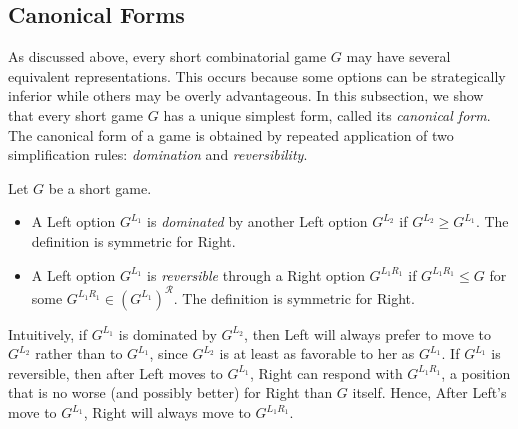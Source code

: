 \documentclass[oneside,reqno]{amsart}
\begin{document}
    \subsection{Canonical Forms}\label{subsec: canonical form}
    As discussed above, every short combinatorial game $G$ may have several equivalent representations. This occurs because some options can be strategically inferior 
    while others may be overly advantageous. In this subsection, we show that every short game $G$ has a unique simplest form, called its \emph{canonical form}. The canonical form of a game is obtained by repeated application of two simplification rules: \emph{domination} and \emph{reversibility}.
    

        

    \begin{definition}
        Let $G$ be a short game.
        \begin{itemize}
            \item A Left option $G^{L_1}$ is \emph{dominated} by another Left option $G^{L_2}$ if $G^{L_2} \ge G^{L_1}$. The definition is symmetric for Right.
            
            \item A Left option $G^{L_1}$ is \emph{reversible} through a Right option $G^{L_1R_1}$ if $G^{L_1R_1} \le G$ for some $G^{L_1R_1} \in (G^{L_1})^{\mathscr{R}}$. The definition is symmetric for Right.
        \end{itemize}
    \end{definition}
    Intuitively, if $G^{L_1}$ is dominated by $G^{L_2}$, then Left will always prefer to move to $G^{L_2}$ rather than to $G^{L_1}$, since $G^{L_2}$ is at least as favorable to her as $G^{L_1}$. If $G^{L_1}$ is reversible, then after Left moves to $G^{L_1}$, Right can respond with $G^{L_1R_1}$, a position that is no worse (and possibly better) for Right than $G$ itself. Hence, After Left's move to $G^{L_1}$, Right will always move to $G^{L_1R_1}$.
\end{document}

